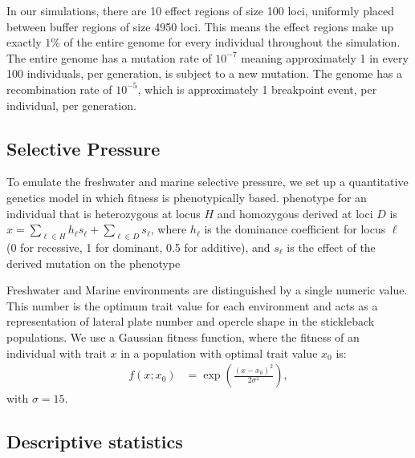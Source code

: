 \documentclass{article}
\begin{document}
In our simulations, there are 10 effect regions of size 100 loci, uniformly placed between buffer regions of size 4950 loci. 
This means the effect regions make up exactly $1\%$ of the entire genome for every individual throughout the simulation. 
The entire genome has a mutation rate of $10^{-7}$ meaning approximately 1 in every 100 individuals, per generation, is subject to a new mutation. 
The genome has a recombination rate of $10^{-5}$, which is approximately 1 breakpoint event, per individual, per generation. 

\subsection*{Selective Pressure}



To emulate the freshwater and marine selective pressure, 
we set up a quantitative genetics model in which fitness is phenotypically based. 
phenotype for an individual that is heterozygous at locus $H$
and homozygous derived at loci $D$ is $x = \sum_{\ell \in H} h_\ell s_\ell + \sum_{\ell \in D} s_\ell$,
where $h_\ell$ is the dominance coefficient for locus $\ell$ (0 for recessive, 1 for dominant, 0.5 for additive),
and $s_\ell$ is the effect of the derived mutation on the phenotype

Freshwater and Marine environments are distinguished by a single numeric value. 
This number is the optimum trait value for each environment
and acts as a representation of lateral plate number and opercle shape in the stickleback populations.
We use a Gaussian fitness function, 
where the fitness of an individual with trait $x$ in a population with optimal trait value $x_0$ is:
\begin{align}
    f(x; x_0) &= \exp\left(\frac{(x - x_0)^2 }{ 2 \sigma^2}\right),
\end{align}
with $\sigma = 15$.


\subsection*{Descriptive statistics}
\end{document}
